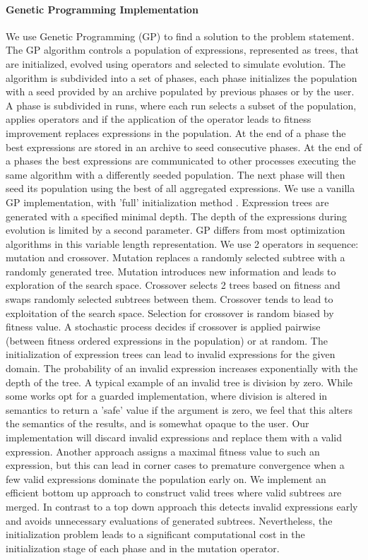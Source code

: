 \paragraph{Genetic Programming Implementation}
We use Genetic Programming (GP) \cite{GP} to find a solution to the problem statement. The GP algorithm controls a population of expressions, represented as trees, that are initialized, evolved using operators and selected to simulate evolution.
The algorithm is subdivided into a set of phases, each phase initializes the population with a seed provided by an archive populated by previous phases or by the user. A phase is subdivided in runs, where each run selects a subset of the population, applies operators and if the application of the operator leads to fitness improvement replaces expressions in the population. At the end of a phase the best expressions are stored in an archive to seed consecutive phases. At the end of a phases the best expressions are communicated to other processes executing the same algorithm with a differently seeded population. The next phase will then seed its population using the best of all aggregated expressions.
We use a vanilla GP implementation, with 'full' initialization method \cite{GP}. Expression trees are generated with a specified minimal depth. The depth of the expressions during evolution is limited by a second parameter. GP differs from most optimization algorithms in this variable length representation. 
We use 2 operators in sequence: mutation and crossover. Mutation replaces a randomly selected subtree with a randomly generated tree. Mutation introduces new information and leads to exploration of the search space. Crossover selects 2 trees based on fitness and swaps randomly selected subtrees between them. Crossover tends to lead to exploitation of the search space. Selection for crossover is random biased by fitness value. A stochastic process decides if crossover is applied pairwise (between fitness ordered expressions in the population) or at random.
The initialization of expression trees can lead to invalid expressions for the given domain. The probability of an invalid expression increases exponentially with the depth of the tree. A typical example of an invalid tree is division by zero. While some works opt for a guarded implementation, where division is altered in semantics to return a 'safe' value if the argument is zero, we feel that this alters the semantics of the results, and is somewhat opaque to the user. Our implementation will discard invalid expressions and replace them with a valid expression. Another approach assigns a maximal fitness value to such an expression, but this can lead in corner cases to premature convergence when a few valid expressions dominate the population early on. We implement an efficient bottom up approach to construct valid trees where valid subtrees are merged. In contrast to a top down approach this detects invalid expressions early and avoids unnecessary evaluations of generated subtrees. Nevertheless, the initialization problem leads to a significant computational cost in the initialization stage of each phase and in the mutation operator.